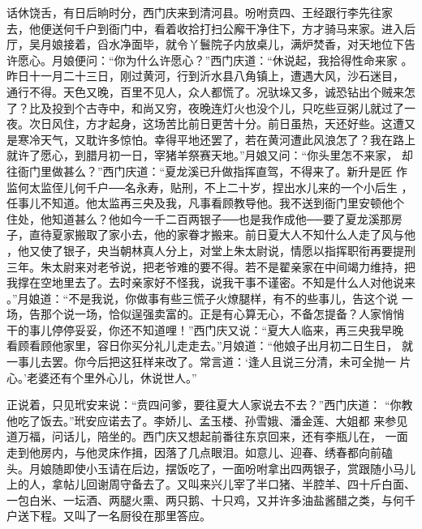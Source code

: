 话休饶舌，有日后晌时分，西门庆来到清河县。吩咐贲四、王经跟行李先往家
去，他便送何千户到衙门中，看着收拾打扫公廨干净住下，方才骑马来家。进入后
厅，吴月娘接着，舀水净面毕，就令丫鬟院子内放桌儿，满炉焚香，对天地位下告
许愿心。月娘便问：“你为什么许愿心？”西门庆道：“休说起，我拾得性命来家
。昨日十一月二十三日，刚过黄河，行到沂水县八角镇上，遭遇大风，沙石迷目，
通行不得。天色又晚，百里不见人，众人都慌了。况驮垛又多，诚恐钻出个贼来怎
了？比及投到个古寺中，和尚又穷，夜晚连灯火也没个儿，只吃些豆粥儿就过了一
夜。次日风住，方才起身，这场苦比前日更苦十分。前日虽热，天还好些。这遭又
是寒冷天气，又耽许多惊怕。幸得平地还罢了，若在黄河遭此风浪怎了？我在路上
就许了愿心，到腊月初一日，宰猪羊祭赛天地。”月娘又问：“你头里怎不来家，
却往衙门里做甚么？”西门庆道：“夏龙溪已升做指挥直驾，不得来了。新升是匠
作监何太监侄儿何千户──名永寿，贴刑，不上二十岁，捏出水儿来的一个小后生
，任事儿不知道。他太监再三央及我，凡事看顾教导他。我不送到衙门里安顿他个
住处，他知道甚么？他如今一千二百两银子──也是我作成他──要了夏龙溪那房
子，直待夏家搬取了家小去，他的家眷才搬来。前日夏大人不知什么人走了风与他
，他又使了银子，央当朝林真人分上，对堂上朱太尉说，情愿以指挥职衔再要提刑
三年。朱太尉来对老爷说，把老爷难的要不得。若不是翟亲家在中间竭力维持，把
我撑在空地里去了。去时亲家好不怪我，说我干事不谨密。不知是什么人对他说来
。”月娘道：“不是我说，你做事有些三慌子火燎腿样，有不的些事儿，告这个说
一场，告那个说一场，恰似逞强卖富的。正是有心算无心，不备怎提备？人家悄悄
干的事儿停停妥妥，你还不知道哩！”西门庆又说：“夏大人临来，再三央我早晚
看顾看顾他家里，容日你买分礼儿走走去。”月娘道：“他娘子出月初二日生日，
就一事儿去罢。你今后把这狂样来改了。常言道：‘逢人且说三分清，未可全抛一
片心。’老婆还有个里外心儿，休说世人。”

正说着，只见玳安来说：“贲四问爹，要往夏大人家说去不去？”西门庆道：
“你教他吃了饭去。”玳安应诺去了。李娇儿、孟玉楼、孙雪娥、潘金莲、大姐都
来参见道万福，问话儿，陪坐的。西门庆又想起前番往东京回来，还有李瓶儿在，
一面走到他房内，与他灵床作揖，因落了几点眼泪。如意儿、迎春、绣春都向前磕
头。月娘随即使小玉请在后边，摆饭吃了，一面吩咐拿出四两银子，赏跟随小马儿
上的人，拿帖儿回谢周守备去了。又叫来兴儿宰了半口猪、半腔羊、四十斤白面、
一包白米、一坛酒、两腿火熏、两只鹅、十只鸡，又并许多油盐酱醋之类，与何千
户送下程。又叫了一名厨役在那里答应。

